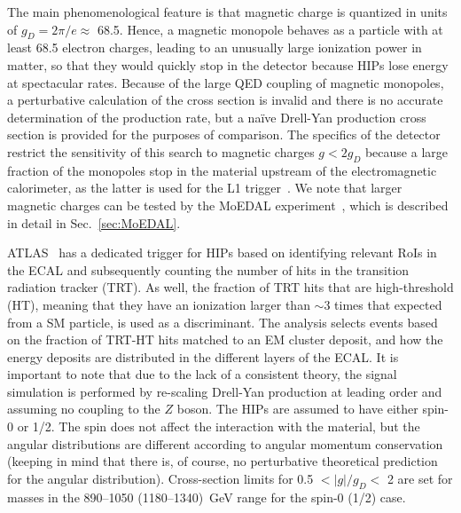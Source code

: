 {The main phenomenological feature is that magnetic charge is quantized in units of $g_D = 2\pi/e \approx$ 68.5. Hence, a magnetic monopole behaves as a particle with at least 68.5 electron charges, leading to an unusually large ionization power in matter, so that they would quickly stop in the detector because HIPs lose energy at spectacular rates. Because of the large QED coupling of magnetic monopoles, a perturbative calculation of the cross section is invalid and there is no accurate determination of the production rate, but a na\"ive Drell-Yan production cross section is provided for the purposes of comparison. The specifics of the detector restrict the sensitivity of this search to magnetic charges $g < 2 g_D$ because a large fraction of the monopoles stop in the material upstream of the electromagnetic calorimeter, as the latter is used for the L1 trigger~\cite{DeRoeck:2011aa}. We note that larger magnetic charges can be tested by the MoEDAL experiment~\cite{MoEDAL:2016jlb}, which is described in detail in Sec.~\ref{sec:MoEDAL}.

ATLAS~\cite{Aad:2015kta} has a dedicated trigger for HIPs based on identifying relevant RoIs in the ECAL and subsequently counting the number of hits in the transition radiation tracker (TRT). As well, the fraction of TRT hits that are high-threshold (HT), meaning that they have an ionization larger than $\sim3$ times that expected from a SM particle, is used as a discriminant. The analysis selects events based on the fraction of TRT-HT hits matched to an EM cluster deposit, and how the energy deposits are distributed in the different layers of the ECAL. It is important to note that due to the lack of a consistent theory, the signal simulation is performed by re-scaling Drell-Yan production at leading order and assuming no coupling to the $Z$ boson. The HIPs are assumed to have either spin-0 or 1/2. The spin does not affect the interaction with the material, but the angular distributions are different according to angular momentum conservation (keeping in mind that there is, of course, no perturbative theoretical prediction for the angular distribution). Cross-section limits for 0.5 $< |g|/g_D <$ 2 are set for masses in the 890--1050 (1180--1340)~GeV range for the spin-0 (1/2) case.

}
